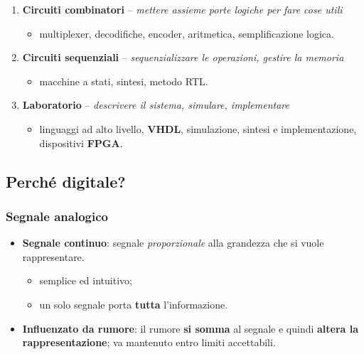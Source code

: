 \documentclass[12pt, a4paper]{article}
\begin{document}
\begin{enumerate}
    \item \textcolor{blue!70!black}{\textbf{Circuiti combinatori}} -- \emph{mettere assieme porte logiche per fare cose utili}
    \begin{itemize}
        \item multiplexer, decodifiche, encoder, aritmetica, semplificazione logica.
    \end{itemize}
    \item \textcolor{red!80!black}{\textbf{Circuiti sequenziali}} -- \emph{sequenzializzare le operazioni, gestire la memoria}
    \begin{itemize}
        \item macchine a stati, sintesi, metodo RTL.
    \end{itemize}
    \item \textcolor{orange!90!black}{\textbf{Laboratorio}} -- \emph{descrivere il sistema, simulare, implementare}
    \begin{itemize}
        \item linguaggi ad alto livello, \textbf{VHDL}, simulazione, sintesi e implementazione, dispositivi \textbf{FPGA}.
    \end{itemize}
\end{enumerate}

\subsection{Perché digitale?}

\subsubsection{Segnale analogico}
\begin{itemize}
    \item \textcolor{blue!70!black}{\textbf{Segnale continuo}}: segnale \emph{proporzionale} alla grandezza che si vuole rappresentare.
    \begin{itemize}
        \item semplice ed intuitivo;
        \item un solo segnale porta \textbf{tutta} l'informazione.
    \end{itemize}
    \item \textcolor{red!80!black}{\textbf{Influenzato da rumore}}: il rumore \textbf{si somma} al segnale e quindi \textbf{altera la rappresentazione}; va mantenuto entro limiti accettabili.
\end{itemize}
\end{document}
